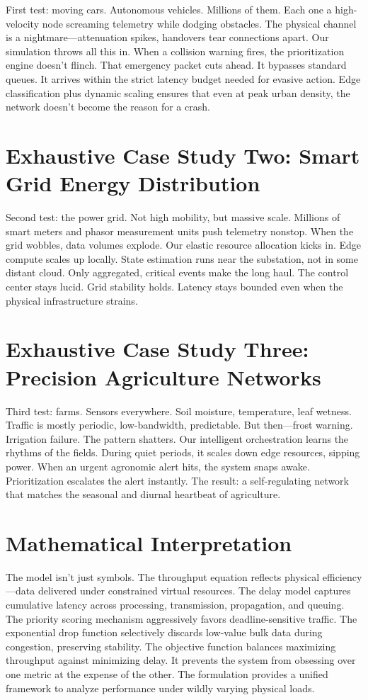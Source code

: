\documentclass[a4paper,fleqn]{cas-dc}
\numberwithin{equation}{section}
\begin{document}
First test: moving cars. Autonomous vehicles. Millions of them. Each one a high-velocity node screaming telemetry while dodging obstacles. The physical channel is a nightmare—attenuation spikes, handovers tear connections apart. Our simulation throws all this in. When a collision warning fires, the prioritization engine doesn't flinch. That emergency packet cuts ahead. It bypasses standard queues. It arrives within the strict latency budget needed for evasive action. Edge classification plus dynamic scaling ensures that even at peak urban density, the network doesn't become the reason for a crash.

\section{Exhaustive Case Study Two: Smart Grid Energy Distribution}

Second test: the power grid. Not high mobility, but massive scale. Millions of smart meters and phasor measurement units push telemetry nonstop. When the grid wobbles, data volumes explode. Our elastic resource allocation kicks in. Edge compute scales up locally. State estimation runs near the substation, not in some distant cloud. Only aggregated, critical events make the long haul. The control center stays lucid. Grid stability holds. Latency stays bounded even when the physical infrastructure strains.

\section{Exhaustive Case Study Three: Precision Agriculture Networks}

Third test: farms. Sensors everywhere. Soil moisture, temperature, leaf wetness. Traffic is mostly periodic, low-bandwidth, predictable. But then—frost warning. Irrigation failure. The pattern shatters. Our intelligent orchestration learns the rhythms of the fields. During quiet periods, it scales down edge resources, sipping power. When an urgent agronomic alert hits, the system snaps awake. Prioritization escalates the alert instantly. The result: a self-regulating network that matches the seasonal and diurnal heartbeat of agriculture.

\section{Mathematical Interpretation}

The model isn't just symbols. The throughput equation reflects physical efficiency—data delivered under constrained virtual resources. The delay model captures cumulative latency across processing, transmission, propagation, and queuing. The priority scoring mechanism aggressively favors deadline-sensitive traffic. The exponential drop function selectively discards low-value bulk data during congestion, preserving stability. The objective function balances maximizing throughput against minimizing delay. It prevents the system from obsessing over one metric at the expense of the other. The formulation provides a unified framework to analyze performance under wildly varying physical loads.
\end{document}
